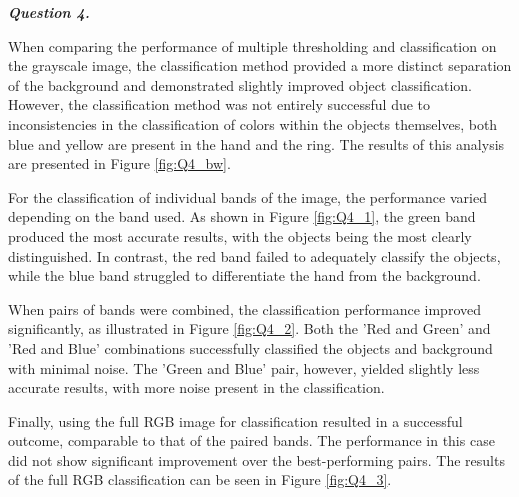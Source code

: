 \documentclass[12pt]{article}
\begin{document}
\textbf{\emph{Question 4.}}

When comparing the performance of multiple thresholding and classification on the grayscale image, the classification method provided a more distinct separation of the background and demonstrated slightly improved object classification. However, the classification method was not entirely successful due to inconsistencies in the classification of colors within the objects themselves, both blue and yellow are present in the hand and the ring. The results of this analysis are presented in Figure \ref{fig:Q4_bw}.

For the classification of individual bands of the image, the performance varied depending on the band used. As shown in Figure \ref{fig:Q4_1}, the green band produced the most accurate results, with the objects being the most clearly distinguished. In contrast, the red band failed to adequately classify the objects, while the blue band struggled to differentiate the hand from the background.

When pairs of bands were combined, the classification performance improved significantly, as illustrated in Figure \ref{fig:Q4_2}. Both the 'Red and Green' and 'Red and Blue' combinations successfully classified the objects and background with minimal noise. The 'Green and Blue' pair, however, yielded slightly less accurate results, with more noise present in the classification.

Finally, using the full RGB image for classification resulted in a successful outcome, comparable to that of the paired bands. The performance in this case did not show significant improvement over the best-performing pairs. The results of the full RGB classification can be seen in Figure \ref{fig:Q4_3}.
\end{document}
